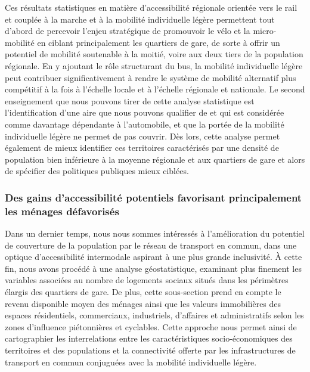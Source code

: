 \begin{refsegment}
Ces résultats statistiques en matière d'accessibilité régionale orientée vers le rail et couplée à la marche et à la mobilité individuelle légère permettent tout d'abord de percevoir l'enjeu stratégique de promouvoir le vélo et la micro-mobilité en ciblant principalement les quartiers de gare, de sorte à offrir un potentiel de mobilité soutenable à la moitié, voire aux deux tiers de la population régionale. En y ajoutant le rôle structurant du bus, la mobilité individuelle légère peut contribuer significativement à rendre le système de mobilité alternatif plus compétitif à la fois à l'échelle locale et à l'échelle régionale et nationale. Le second enseignement que nous pouvons tirer de cette analyse statistique est l'identification d'une aire que nous pouvons qualifier de  et qui est considérée comme davantage dépendante à l'automobile, et que la portée de la mobilité individuelle légère ne permet de pas couvrir. Dès lors, cette analyse permet également de mieux identifier ces territoires caractérisés par une densité de population bien inférieure à la moyenne régionale et aux quartiers de gare et alors de spécifier des politiques publiques mieux ciblées.

\subsubsection*{Des gains d'accessibilité potentiels favorisant principalement les ménages défavorisés
    \label{chap5:accessibilite-inclusive}
    }

Dans un dernier temps, nous nous sommes intéressés à l'amélioration du potentiel de couverture de la population par le réseau de transport en commun, dans une optique d'accessibilité intermodale aspirant à une plus grande inclusivité. À cette fin, nous avons procédé à une analyse géostatistique, examinant plus finement les variables associées au nombre de logements sociaux situés dans les périmètres élargis des quartiers de gare. De plus, cette sous-section prend en compte le revenu disponible moyen des ménages ainsi que les valeurs immobilières des espaces résidentiels, commerciaux, industriels, d'affaires et administratifs selon les zones d'influence piétonnières et cyclables. Cette approche nous permet ainsi de cartographier les interrelations entre les caractéristiques socio-économiques des territoires et des populations et la connectivité offerte par les infrastructures de transport en commun conjuguées avec la mobilité individuelle légère.%


\end{refsegment}
